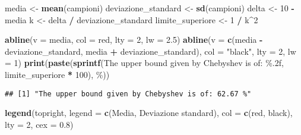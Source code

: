\documentclass[
]{article}
\newenvironment{Shaded}{\begin{snugshade}}{\end{snugshade}}
\newcommand{\AttributeTok}[1]{\textcolor[rgb]{0.13,0.29,0.53}{#1}}
\newcommand{\DecValTok}[1]{\textcolor[rgb]{0.00,0.00,0.81}{#1}}
\newcommand{\FloatTok}[1]{\textcolor[rgb]{0.00,0.00,0.81}{#1}}
\newcommand{\FunctionTok}[1]{\textcolor[rgb]{0.13,0.29,0.53}{\textbf{#1}}}
\newcommand{\NormalTok}[1]{#1}
\newcommand{\OtherTok}[1]{\textcolor[rgb]{0.56,0.35,0.01}{#1}}
\newcommand{\SpecialCharTok}[1]{\textcolor[rgb]{0.81,0.36,0.00}{\textbf{#1}}}
\newcommand{\StringTok}[1]{\textcolor[rgb]{0.31,0.60,0.02}{#1}}
\begin{document}
\begin{Shaded}
\begin{Highlighting}[]
\NormalTok{media }\OtherTok{\textless{}{-}} \FunctionTok{mean}\NormalTok{(campioni)}
\NormalTok{deviazione\_standard }\OtherTok{\textless{}{-}} \FunctionTok{sd}\NormalTok{(campioni)}
\NormalTok{delta }\OtherTok{\textless{}{-}} \DecValTok{10} \SpecialCharTok{{-}}\NormalTok{ media }
\NormalTok{k }\OtherTok{\textless{}{-}}\NormalTok{ delta }\SpecialCharTok{/}\NormalTok{ deviazione\_standard}
\NormalTok{limite\_superiore }\OtherTok{\textless{}{-}} \DecValTok{1} \SpecialCharTok{/}\NormalTok{ k}\SpecialCharTok{\^{}}\DecValTok{2} 

\FunctionTok{abline}\NormalTok{(}\AttributeTok{v =}\NormalTok{ media, }\AttributeTok{col =} \StringTok{\textquotesingle{}red\textquotesingle{}}\NormalTok{, }\AttributeTok{lty =} \DecValTok{2}\NormalTok{, }\AttributeTok{lw =} \FloatTok{2.5}\NormalTok{)}
\FunctionTok{abline}\NormalTok{(}\AttributeTok{v =} \FunctionTok{c}\NormalTok{(media }\SpecialCharTok{{-}}\NormalTok{ deviazione\_standard, media }\SpecialCharTok{+}\NormalTok{ deviazione\_standard), }\AttributeTok{col =} \StringTok{"black"}\NormalTok{, }\AttributeTok{lty =} \DecValTok{2}\NormalTok{, }\AttributeTok{lw =} \DecValTok{1}\NormalTok{)}
\FunctionTok{print}\NormalTok{(}\FunctionTok{paste}\NormalTok{(}\FunctionTok{sprintf}\NormalTok{(}\StringTok{\textquotesingle{}The upper bound given by Chebyshev is of: \%.2f\textquotesingle{}}\NormalTok{, limite\_superiore }\SpecialCharTok{*} \DecValTok{100}\NormalTok{), }\StringTok{\textquotesingle{}\%\textquotesingle{}}\NormalTok{))}
\end{Highlighting}
\end{Shaded}

\begin{verbatim}
## [1] "The upper bound given by Chebyshev is of: 62.67 %"
\end{verbatim}

\begin{Shaded}
\begin{Highlighting}[]
\FunctionTok{legend}\NormalTok{(}\StringTok{\textquotesingle{}topright\textquotesingle{}}\NormalTok{, }\AttributeTok{legend =} \FunctionTok{c}\NormalTok{(}\StringTok{\textquotesingle{}Media\textquotesingle{}}\NormalTok{, }\StringTok{\textquotesingle{}Deviazione standard\textquotesingle{}}\NormalTok{),}
       \AttributeTok{col =} \FunctionTok{c}\NormalTok{(}\StringTok{\textquotesingle{}red\textquotesingle{}}\NormalTok{, }\StringTok{\textquotesingle{}black\textquotesingle{}}\NormalTok{), }\AttributeTok{lty =} \DecValTok{2}\NormalTok{, }\AttributeTok{cex =} \FloatTok{0.8}\NormalTok{)}
\end{Highlighting}
\end{Shaded}
\end{document}
